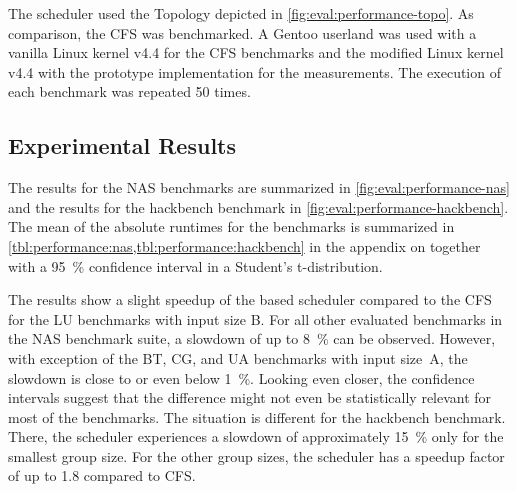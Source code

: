 The \cobas{} scheduler used the Topology depicted in \cref{fig:eval:performance-topo}. As comparison, the \ac{CFS} was benchmarked. A Gentoo userland was used with a vanilla Linux kernel v4.4 for the \ac{CFS} benchmarks and the modified Linux kernel v4.4 with the \cobas{} prototype implementation for the \cobas{} measurements. The execution of each benchmark was repeated \num{50} times.

\subsection{Experimental Results}%
\label{sec:studies:nas:results}

The results for the \ac{NAS} benchmarks are summarized in \cref{fig:eval:performance-nas} and the results for the hackbench benchmark in \cref{fig:eval:performance-hackbench}. The mean of the absolute runtimes for the benchmarks is summarized in \cref{tbl:performance:nas,tbl:performance:hackbench} in the appendix on  together with a \SI{95}{\percent} confidence interval in a Student's t-distribution.


The results show a slight speedup of the \cobas{} based scheduler compared to the \ac{CFS} for the LU benchmarks with input size B. For all other evaluated benchmarks in the \ac{NAS} benchmark suite, a slowdown of up to \SI{8}{\percent} can be observed. However, with exception of the BT, CG, and UA benchmarks with input size~A, the slowdown is close to or even below \SI{1}{\percent}. Looking even closer, the confidence intervals suggest that the difference might not even be statistically relevant for most of the benchmarks.  The situation is different for the hackbench benchmark. There, the \cobas{} scheduler experiences a slowdown of approximately \SI{15}{\percent} only for the smallest group size. For the other group sizes, the \cobas{} scheduler has a speedup factor of up to \num{1.8} compared to \ac{CFS}.

